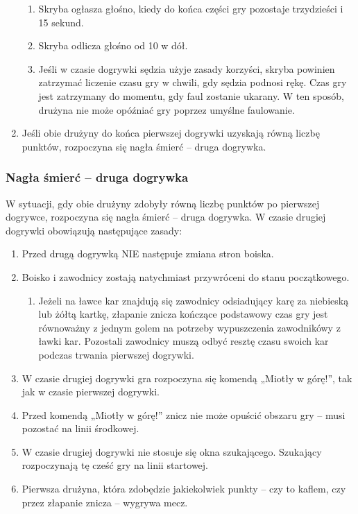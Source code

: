 \documentclass[12pt]{article}
\begin{document}
\begin{enumerate}
\begin{enumerate}
		      \item Skryba ogłasza głośno, kiedy do końca części gry pozostaje
		            trzydzieści i 15 sekund.

		      \item Skryba odlicza głośno od 10 w dół.

		      \item Jeśli w czasie dogrywki sędzia użyje zasady korzyści, skryba
		            powinien zatrzymać liczenie czasu gry w chwili, gdy sędzia podnosi rękę.
		            Czas gry jest zatrzymany do momentu, gdy faul zostanie ukarany. W ten
		            sposób, drużyna nie może opóźniać gry poprzez umyślne faulowanie.
	      \end{enumerate}

	\item Jeśli obie drużyny do końca pierwszej dogrywki uzyskają równą liczbę
	      punktów, rozpoczyna się nagła śmierć -- druga dogrywka.
\end{enumerate}

\subsubsection{Nagła śmierć -- druga dogrywka}
W sytuacji, gdy obie
drużyny zdobyły równą liczbę punktów po pierwszej dogrywce, rozpoczyna
się nagła śmierć -- druga dogrywka. W czasie drugiej dogrywki obowiązują
następujące zasady:

\begin{enumerate}
	\item Przed drugą dogrywką NIE następuje zmiana stron boiska.

	\item Boisko i zawodnicy zostają natychmiast przywróceni do stanu
	      początkowego.
	      \begin{enumerate}
		      \item Jeżeli na ławce kar znajdują się zawodnicy odsiadujący karę za
		            niebieską lub żółtą kartkę, złapanie znicza kończące podstawowy czas gry
		            jest równoważny z jednym golem na potrzeby wypuszczenia zawodnikówy z
		            ławki kar. Pozostali zawodnicy muszą odbyć resztę czasu swoich kar
		            podczas trwania pierwszej dogrywki.
	      \end{enumerate}
	\item W czasie drugiej dogrywki gra rozpoczyna się komendą „Miotły w
	      górę!'', tak jak w czasie pierwszej dogrywki.

	\item Przed komendą „Miotły w górę!'' znicz nie może opuścić obszaru gry --
	      musi pozostać na linii środkowej.

	\item W czasie drugiej dogrywki nie stosuje się okna szukającego. Szukający
	      rozpoczynają tę cześć gry na linii startowej.

	\item Pierwsza drużyna, która zdobędzie jakiekolwiek punkty -- czy to
	      kaflem, czy przez złapanie znicza -- wygrywa mecz.
\end{enumerate}
\end{document}
